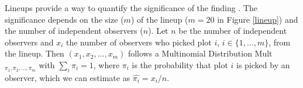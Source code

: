 


Lineups provide a way to quantify the significance of the finding
\citet{majumder:2011}. 
%
The significance depends on the size ($m$) of
the lineup ($m=20$ in Figure \ref{lineup}) and the number of
independent observers ($n$). Let $n$ be the number of independent observers and $x_i$ the number of observers who picked plot $i$, $i \in \{1, ..., m\}$, from the lineup. Then $(x_1, x_2, ..., x_m)$ follows a Multinomial Distribution Mult$_{\pi_1, \pi_2, ..., \pi_m}$ with $\sum_i \pi_i = 1$, where $\pi_i$ is the probability that plot $i$ is picked by an observer, which we can estimate as $\widehat{\pi_i} = x_i/n$. 

